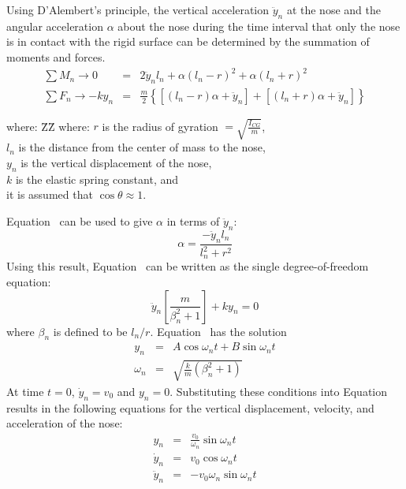 Using D'Alembert's principle, the vertical acceleration $\ddot y_n$ at the
nose and the angular acceleration $\alpha$ about the nose during
the time interval that only the nose is in contact with the rigid
surface can be determined by the summation of moments and forces.
\begin{eqnarray}
\sum M_n\rightarrow 0  & = & 2 \ddot y_n l_n +\alpha(l_n-r)^2
     +\alpha(l_n+r)^2\label{e1} \\
\sum F_n\rightarrow -ky_n & = & \frac{m}{2}\left\{\left[(l_n-r)\alpha
     +\ddot y_n \right] +\left[(l_n+r)\alpha+\ddot y_n\right]\right\}\label{e2}
\end{eqnarray}
\begin{tabbing}
where: \=ZZ\= \kill
where: \>$r  $\> is the radius of gyration ${}=\sqrt{\frac{I_{CG}}{m}}$,\\
       \>$l_n$\> is the distance from the center of mass to the nose,\\
       \>$y_n$\> is the vertical displacement of the nose,\\
       \>$k  $\> is the elastic spring constant, and\\
       \>     \> it is assumed that $\cos\theta\approx 1$.
\end{tabbing}
Equation~ can be used to give $\alpha$ in terms of $\ddot y_n$:
\begin{equation}
\alpha = \frac{-\ddot y_n l_n}{l_n^2 + r^2}\label{eq:alpha}
\end{equation}
Using this result, Equation~ can be written as the single
degree-of-freedom equation:
\begin{equation}
\ddot y_n\left[\frac{m}{\beta_n^2+1}\right] + ky_n = 0\label{eq:diff}
\end{equation}
where $\beta_n$ is defined to be $l_n/r$.  Equation~ has the
solution
\begin{eqnarray}
     y_n & = & A\cos\omega_n t + B\sin\omega_n t\label{eq:acbs}\\
\omega_n & = & \sqrt{\frac{k}{m}\left(\beta_n^2+1\right)}
\end{eqnarray}
At time $t=0$, $\dot y_n = v_0$ and $y_n = 0$.  Substituting these
conditions into Equation~ results in the following equations
for the vertical displacement, velocity, and acceleration of the nose:
\begin{eqnarray}
      y_n & = &  \frac{v_0}{\omega_n}\sin\omega_n t\\
 \dot y_n & = &  v_0\cos\omega_n t\label{eq:vl}\\
\ddot y_n & = & -v_0\omega_n\sin\omega_n t\label{eq:ayl}
\end{eqnarray}
